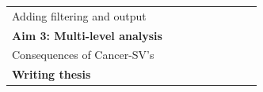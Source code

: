 \documentclass[twoside,fontsize=10pt]{article}
\begin{document}
\begin{table}[h]
\begin{center}
\begin{tabular}{lllllllll}
\hspace*{1em} Adding filtering and output       &                                                 &                                                 &                                                 & \cellcolor[HTML]{656565}                        &                                                \cellcolor[HTML]{656565}   &                                                 &                                                 &                                                 \\
\textbf{Aim 3: Multi-level analysis}            &                                                 &                                                 &                                                 &                                                 &  & \cellcolor[HTML]{343434}{\color[HTML]{343434} } & \cellcolor[HTML]{343434}{\color[HTML]{343434} } & \cellcolor[HTML]{343434}{\color[HTML]{343434} } \\
\hspace*{1em} Consequences of Cancer-SV's       &                                                 &                                                 &                                                 &                                                 &                        & \cellcolor[HTML]{656565}                  & \cellcolor[HTML]{656565}                     & \cellcolor[HTML]{656565}                   \\
\textbf{Writing thesis}                         &                                                 &                                                 &                                                 &                                                 &                                                 &                                                 &                                                 & \cellcolor[HTML]{343434}                       
\end{tabular}
\end{center}
\end{table}
\end{document}
